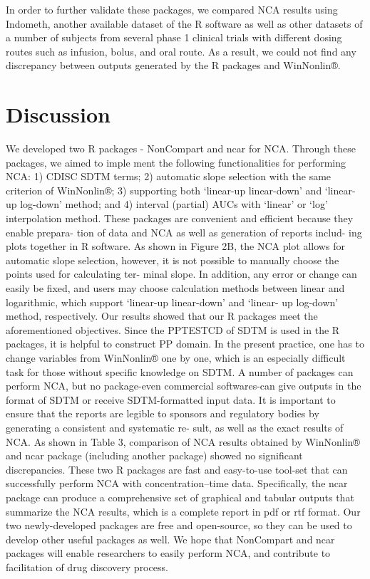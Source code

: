 \documentclass[12pt,]{krantz}
\theoremstyle{definition}
\theoremstyle{definition}
\theoremstyle{definition}
\theoremstyle{remark}
\begin{document}
In order to further validate these packages, we compared NCA results
using Indometh, another available dataset of the R software as well as
other datasets of a number of subjects from several phase 1 clinical
trials with different dosing routes such as infusion, bolus, and oral
route. As a result, we could not find any discrepancy between outputs
generated by the R packages and WinNonlin®.

\chapter{Discussion}\label{discussion}

We developed two R packages - NonCompart and ncar for NCA. Through these
packages, we aimed to imple ment the following functionalities for
performing NCA: 1) CDISC SDTM terms; 2) automatic slope selection with
the same criterion of WinNonlin®; 3) supporting both `linear-up
linear-down' and `linear-up log-down' method; and 4) interval (partial)
AUCs with `linear' or `log' interpolation method. These packages are
convenient and efficient because they enable prepara- tion of data and
NCA as well as generation of reports includ- ing plots together in R
software. As shown in Figure 2B, the NCA plot allows for automatic slope
selection, however, it is not possible to manually choose the points
used for calculating ter- minal slope. In addition, any error or change
can easily be fixed, and users may choose calculation methods between
linear and logarithmic, which support `linear-up linear-down' and
`linear- up log-down' method, respectively. Our results showed that our
R packages meet the aforementioned objectives. Since the PPTESTCD of
SDTM is used in the R packages, it is helpful to construct PP domain. In
the present practice, one has to change variables from WinNonlin® one by
one, which is an especially difficult task for those without specific
knowledge on SDTM. A number of packages can perform NCA, but no
package-even commercial softwares-can give outputs in the format of SDTM
or receive SDTM-formatted input data. It is important to ensure that the
reports are legible to sponsors and regulatory bodies by generating a
consistent and systematic re- sult, as well as the exact results of NCA.
As shown in Table 3, comparison of NCA results obtained by WinNonlin®
and ncar package (including another package) showed no significant
discrepancies. These two R packages are fast and easy-to-use tool-set
that can successfully perform NCA with concentration--time data.
Specifically, the ncar package can produce a comprehensive set of
graphical and tabular outputs that summarize the NCA results, which is a
complete report in pdf or rtf format. Our two newly-developed packages
are free and open-source, so they can be used to develop other useful
packages as well. We hope that NonCompart and ncar packages will enable
researchers to easily perform NCA, and contribute to facilitation of
drug discovery process.
\end{document}

